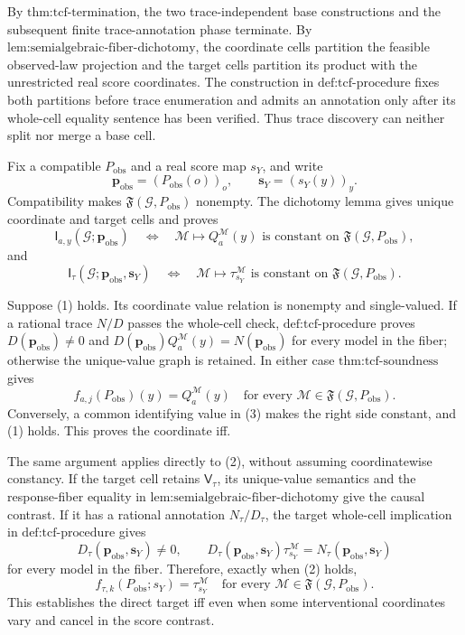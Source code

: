 By \(\text{thm:tcf-termination}\), the two trace-independent base constructions and the subsequent finite trace-annotation phase terminate.  By \(\text{lem:semialgebraic-fiber-dichotomy}\), the coordinate cells partition the feasible observed-law projection and the target cells partition its product with the unrestricted real score coordinates.  The construction in \(\text{def:tcf-procedure}\) fixes both partitions before trace enumeration and admits an annotation only after its whole-cell equality sentence has been verified.  Thus trace discovery can neither split nor merge a base cell.

Fix a compatible \(P_{\mathrm{obs}}\) and a real score map \(s_Y\), and write
\[
\mathbf p_{\mathrm{obs}}=(P_{\mathrm{obs}}(o))_o,
\qquad
\mathbf s_Y=(s_Y(y))_y.
\]
Compatibility makes \(\mathfrak F(\mathcal G,P_{\mathrm{obs}})\) nonempty.  The dichotomy lemma gives unique coordinate and target cells and proves
\[
\mathsf I_{a,y}(\mathcal G;\mathbf p_{\mathrm{obs}})
\quad\Longleftrightarrow\quad
\mathcal M\mapsto Q_a^{\mathcal M}(y)
\text{ is constant on }\mathfrak F(\mathcal G,P_{\mathrm{obs}}),
\tag{1}
\]
and
\[
\mathsf I_\tau(\mathcal G;\mathbf p_{\mathrm{obs}},\mathbf s_Y)
\quad\Longleftrightarrow\quad
\mathcal M\mapsto\tau_{s_Y}^{\mathcal M}
\text{ is constant on }\mathfrak F(\mathcal G,P_{\mathrm{obs}}).
\tag{2}
\]

Suppose (1) holds.  Its coordinate value relation is nonempty and single-valued.  If a rational trace \(N/D\) passes the whole-cell check, \(\text{def:tcf-procedure}\) proves \(D(\mathbf p_{\mathrm{obs}})\neq0\) and \(D(\mathbf p_{\mathrm{obs}})Q_a^{\mathcal M}(y)=N(\mathbf p_{\mathrm{obs}})\) for every model in the fiber; otherwise the unique-value graph is retained.  In either case \(\text{thm:tcf-soundness}\) gives
\[
f_{a,j}(P_{\mathrm{obs}})(y)=Q_a^{\mathcal M}(y)
\quad\text{for every }\mathcal M\in\mathfrak F(\mathcal G,P_{\mathrm{obs}}).
\tag{3}
\]
Conversely, a common identifying value in (3) makes the right side constant, and (1) holds.  This proves the coordinate iff.

The same argument applies directly to (2), without assuming coordinatewise constancy.  If the target cell retains \(\mathsf V_\tau\), its unique-value semantics and the response-fiber equality in \(\text{lem:semialgebraic-fiber-dichotomy}\) give the causal contrast.  If it has a rational annotation \(N_\tau/D_\tau\), the target whole-cell implication in \(\text{def:tcf-procedure}\) gives
\[
D_\tau(\mathbf p_{\mathrm{obs}},\mathbf s_Y)\neq0,
\qquad
D_\tau(\mathbf p_{\mathrm{obs}},\mathbf s_Y)\tau_{s_Y}^{\mathcal M}
=N_\tau(\mathbf p_{\mathrm{obs}},\mathbf s_Y)
\tag{4}
\]
for every model in the fiber.  Therefore, exactly when (2) holds,
\[
f_{\tau,k}(P_{\mathrm{obs}};s_Y)=\tau_{s_Y}^{\mathcal M}
\quad\text{for every }\mathcal M\in\mathfrak F(\mathcal G,P_{\mathrm{obs}}).
\tag{5}
\]
This establishes the direct target iff even when some interventional coordinates vary and cancel in the score contrast.


